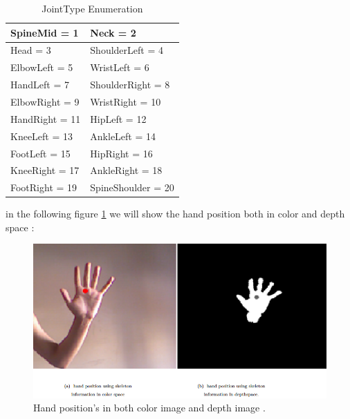 \begin{table}[H]
\centering
\caption{JointType Enumeration}
 \label{table:t1} 
\begin{tabu} to 0.5\textwidth { | X[l] | X[r] | }

 \hline
 SpineMid = 1  & Neck = 2    \\
 \hline 
 Head = 3  &  ShoulderLeft = 4    \\
\hline
  ElbowLeft = 5   &  WristLeft = 6    \\
\hline

 HandLeft =	7  &   ShoulderRight = 8    \\
\hline
 
ElbowRight = 9  &  WristRight = 10   \\
\hline
 
 HandRight = 11  &  HipLeft = 12   \\
\hline
 
 KneeLeft = 13  &  AnkleLeft = 14   \\
\hline
 
FootLeft = 15  &  HipRight = 16   \\
\hline
 
 KneeRight = 17  & AnkleRight = 18     \\
\hline

FootRight = 19   & SpineShoulder = 20     \\

\hline

 \end{tabu}


 \end{table}

in the following figure \ref{fig:cam9} we will show the hand position both in color and depth space :

\begin{figure}[H]
\centering
\includegraphics[width= 1.0\textwidth]{img/colorvsdepth.PNG}

\caption {Hand position's in both color image and depth image .
\label{fig:cam9}}

\end{figure}




